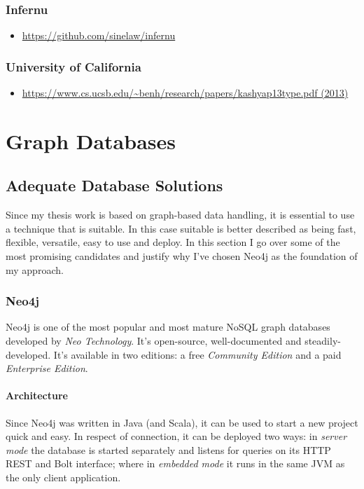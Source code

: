 \subsubsection{Infernu}
\begin{itemize}
 \item \url{https://github.com/sinelaw/infernu}
\end{itemize}

\subsubsection{University of California}
\begin{itemize}
 \item \url{https://www.cs.ucsb.edu/~benh/research/papers/kashyap13type.pdf (2013)}
\end{itemize}


\section{Graph Databases}


\subsection{Adequate Database Solutions}
Since my thesis work is based on graph-based data handling, it is essential to use a technique that is suitable. In this case suitable is better described as being fast, flexible, versatile, easy to use and deploy. In this section I go over some of the most promising candidates and justify why I've chosen Neo4j as the foundation of my approach.

\subsubsection{Neo4j}
Neo4j is one of the most popular and most mature NoSQL graph databases developed by \emph{Neo Technology}. It's open-source, well-documented and steadily-developed. It's available in two editions: a free \emph{Community Edition} and a paid \emph{Enterprise Edition}.~\cite{neo4j}

\paragraph{Architecture}
Since Neo4j was written in Java (and Scala), it can be used to start a new project quick and easy. In respect of connection, it can be deployed two ways: in \emph{server mode} the database is started separately and listens for queries on its HTTP REST and Bolt interface; where in \emph{embedded mode} it runs in the same JVM as the only client application.

